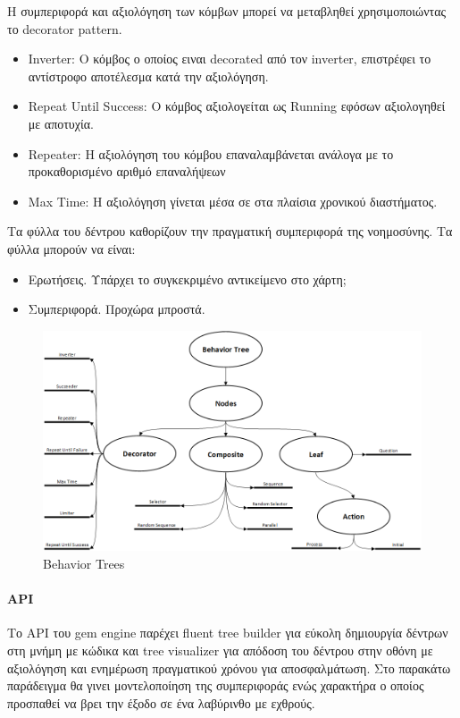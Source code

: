 H συμπεριφορά και αξιολόγηση των κόμβων μπορεί να μεταβληθεί χρησιμοποιώντας το decorator pattern.

\begin{itemize}
	\item Inverter: Ο κόμβος ο οποίος ειναι decorated από τον inverter, επιστρέφει το αντίστροφο αποτέλεσμα κατά την αξιολόγηση.
	\item Repeat Until Success: O κόμβος αξιολογείται ως Running εφόσων αξιολογηθεί με αποτυχία. 
	\item Repeater: Η αξιολόγηση του κόμβου επαναλαμβάνεται ανάλογα με το προκαθορισμένο αριθμό επαναλήψεων
	\item Max Time: Η αξιολόγηση γίνεται μέσα σε στα πλαίσια χρονικού διαστήματος.
\end{itemize}

Τα φύλλα του δέντρου καθορίζουν την πραγματική συμπεριφορά της νοημοσύνης. Τα φύλλα μπορούν να είναι:

\begin{itemize}
	\item Ερωτήσεις. Υπάρχει το συγκεκριμένο αντικείμενο στο χάρτη;
	\item Συμπεριφορά. Προχώρα μπροστά.
\end{itemize}

\begin{figure}[h!]
	\centering
	\includegraphics[width=165mm]{Images/behavior_trees}
	\caption{Behavior Trees}
	\label{fig:behavior_trees}
\end{figure}
	
\paragraph{API}
Το API του gem engine παρέχει fluent tree builder για εύκολη δημιουργία δέντρων στη μνήμη με κώδικα και tree visualizer για απόδοση του δέντρου στην οθόνη με αξιολόγηση και ενημέρωση πραγματικού χρόνου για αποσφαλμάτωση. Στο παρακάτω παράδειγμα θα γινει μοντελοποίηση της συμπεριφοράς ενώς χαρακτήρα ο οποίος προσπαθεί να βρει την έξοδο σε ένα λαβύρινθο με εχθρούς.


